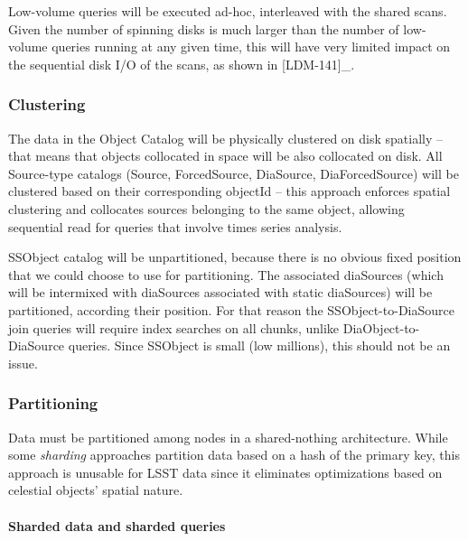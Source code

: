 \documentclass[DM,lsstdraft,toc]{lsstdoc}
\begin{document}
Low-volume queries will be executed ad-hoc, interleaved with the shared
scans. Given the number of spinning disks is much larger than the number
of low-volume queries running at any given time, this will have very
limited impact on the sequential disk I/O of the scans, as shown in
{[}LDM-141{]}\_.

\subsubsection{Clustering}\label{clustering}

The data in the Object Catalog will be physically clustered on disk
spatially -- that means that objects collocated in space will be also
collocated on disk. All Source-type catalogs (Source, ForcedSource,
DiaSource, DiaForcedSource) will be clustered based on their
corresponding objectId -- this approach enforces spatial clustering and
collocates sources belonging to the same object, allowing sequential
read for queries that involve times series analysis.

SSObject catalog will be unpartitioned, because there is no obvious
fixed position that we could choose to use for partitioning. The
associated diaSources (which will be intermixed with diaSources
associated with static diaSources) will be partitioned, according their
position. For that reason the SSObject-to-DiaSource join queries will
require index searches on all chunks, unlike DiaObject-to-DiaSource
queries. Since SSObject is small (low millions), this should not be an
issue.

\subsubsection{Partitioning}\label{partitioning}

Data must be partitioned among nodes in a shared-nothing architecture.
While some \emph{sharding} approaches partition data based on a hash of
the primary key, this approach is unusable for LSST data since it
eliminates optimizations based on celestial objects' spatial nature.

\paragraph{Sharded data and sharded
queries}\label{sharded-data-and-sharded-queries}
\end{document}
